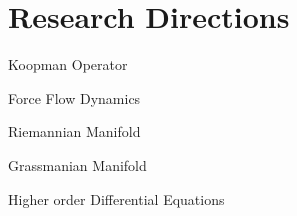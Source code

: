\section{Research Directions}

Koopman Operator

Force Flow Dynamics

Riemannian Manifold

Grassmanian Manifold

Higher order Differential Equations
